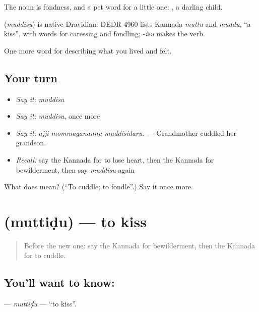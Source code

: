The noun  is fondness, and a pet word for a little one:  , a darling child.

\begin{cousinweb}
\textbf{} (\emph{muddisu}) is native Dravidian: DEDR 4960 lists Kannada \emph{muttu} and \emph{muddu}, \textquotedblleft{}a kiss\textquotedblright{}, with words for caressing and fondling; -\emph{isu} makes the verb.
\end{cousinweb}

\begin{grammarlens}[title={What you've built}]
One more word for describing what you lived and felt.
\end{grammarlens}

\subsection*{Your turn}
\begin{itemize}
\raggedright
  \item \emph{Say it:} \emph{muddisu}
  \item \emph{Say it:} \emph{muddisu}, once more
  \item \emph{Say it:} \emph{ajji mommaganannu muddisidaru.} — Grandmother cuddled her grandson.
  \item \emph{Recall:} say the Kannada for to lose heart, then the Kannada for bewilderment, then say \emph{muddisu} again
\end{itemize}

\begin{tcolorbox}[breakable,colback=teal!4,colframe=teal!35!black,title={Before you move on}]
What does  mean? (\textquotedblleft{}To cuddle; to fondle\textquotedblright{}.) Say it once more.
\end{tcolorbox}
\section[\texorpdfstring{\kn{ಮುತ್ತಿಡು} (muttiḍu)}{ಮುತ್ತಿಡು (muttiḍu)}]{ (muttiḍu) — to kiss}

\label{lesson:KA-C495-muttidu}



\begin{quote}
Before the new one: say the Kannada for bewilderment, then the Kannada for to cuddle.
\end{quote}

\subsection*{You'll want to know: }
\textbf{} — \emph{muttiḍu} — \textquotedblleft{}to kiss\textquotedblright{}.

